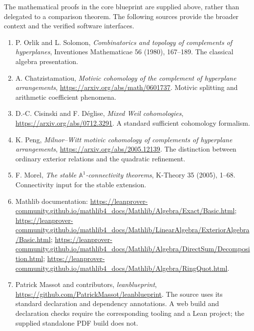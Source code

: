 \documentclass[11pt]{article}
\newcommand{\A}{\mathbb A}
\theoremstyle{definition}
\theoremstyle{remark}
\begin{document}
The mathematical proofs in the core blueprint are supplied above, rather than delegated to a comparison theorem. The following sources provide the broader context and the verified software interfaces.
\begin{enumerate}
\item P. Orlik and L. Solomon, \emph{Combinatorics and topology of complements of hyperplanes}, Inventiones Mathematicae 56 (1980), 167--189. The classical algebra presentation.
\item A. Chatzistamatiou, \emph{Motivic cohomology of the complement of hyperplane arrangements}, \url{https://arxiv.org/abs/math/0601737}. Motivic splitting and arithmetic coefficient phenomena.
\item D.-C. Cisinski and F. D\'eglise, \emph{Mixed Weil cohomologies}, \url{https://arxiv.org/abs/0712.3291}. A standard sufficient cohomology formalism.
\item K. Peng, \emph{Milnor--Witt motivic cohomology of complements of hyperplane arrangements}, \url{https://arxiv.org/abs/2005.12139}. The distinction between ordinary exterior relations and the quadratic refinement.
\item F. Morel, \emph{The stable $\A^1$-connectivity theorems}, K-Theory 35 (2005), 1--68. Connectivity input for the stable extension.
\item Mathlib documentation: \url{https://leanprover-community.github.io/mathlib4_docs/Mathlib/Algebra/Exact/Basic.html}; \url{https://leanprover-community.github.io/mathlib4_docs/Mathlib/LinearAlgebra/ExteriorAlgebra/Basic.html}; \url{https://leanprover-community.github.io/mathlib4_docs/Mathlib/Algebra/DirectSum/Decomposition.html}; \url{https://leanprover-community.github.io/mathlib4_docs/Mathlib/Algebra/RingQuot.html}.
\item Patrick Massot and contributors, \emph{leanblueprint}, \url{https://github.com/PatrickMassot/leanblueprint}. The source uses its standard declaration and dependency annotations. A web build and declaration checks require the corresponding tooling and a Lean project; the supplied standalone PDF build does not.
\end{enumerate}
\end{document}
